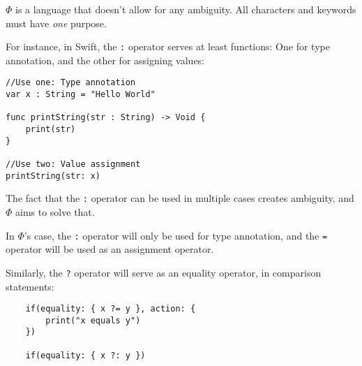 \documentclass[../../main.tex]{subfiles}
\begin{document}
$\Phi$ is a language that doesn't allow for any ambiguity. All characters and keywords must have \textit{one} purpose.

For instance, in Swift, the \texttt{:} operator serves at least functions: One for type annotation, and the other for assigning values:

\begin{verbatim}
//Use one: Type annotation
var x : String = "Hello World"

func printString(str : String) -> Void {
    print(str)
}

//Use two: Value assignment
printString(str: x)
\end{verbatim}

The fact that the \texttt{:} operator can be used in multiple cases creates ambiguity, and $\Phi$ aims to solve that.

In $\Phi$'s case, the \texttt{:} operator will only be used for type annotation, and the \texttt{=} operator will be used as an assignment operator.

Similarly, the \texttt{?} operator will serve as an equality operator, in comparison statements:

\begin{verbatim}
    if(equality: { x ?= y }, action: {
        print("x equals y")
    })

    if(equality: { x ?: y })
\end{verbatim}
\end{document}
